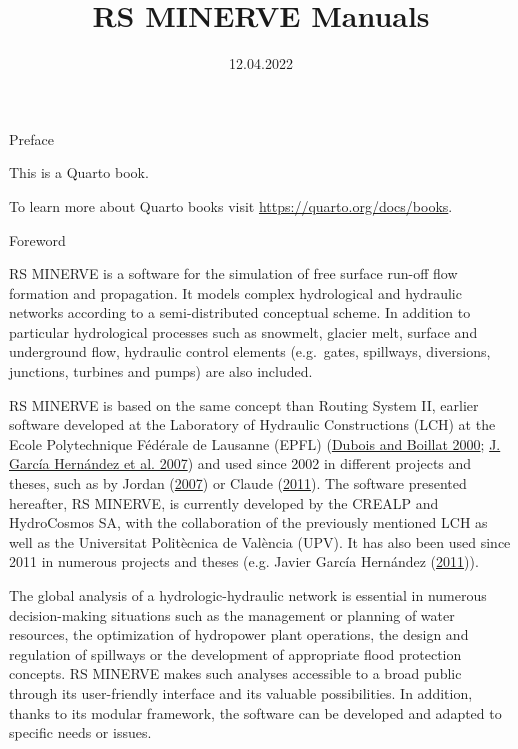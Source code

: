 \documentclass[
  letterpaper,
  DIV=11,
  numbers=noendperiod]{scrreprt}
\title{RS MINERVE Manuals}
\author{}
\date{12.04.2022}
\renewcommand*\contentsname{Table of contents}
\newcommand\contentsname{Table of contents}
\begin{document}
\maketitle

\ifdefined\Shaded\renewenvironment{Shaded}{\begin{tcolorbox}[frame hidden, borderline west={3pt}{0pt}{shadecolor}, enhanced, interior hidden, sharp corners, breakable, boxrule=0pt]}{\end{tcolorbox}}\fi

\renewcommand*\contentsname{Table of contents}
{
\hypersetup{linkcolor=}
\setcounter{tocdepth}{3}
\tableofcontents
}
Preface

This is a Quarto book.

To learn more about Quarto books visit
\url{https://quarto.org/docs/books}.

Foreword

RS MINERVE is a software for the simulation of free surface run-off flow
formation and propagation. It models complex hydrological and hydraulic
networks according to a semi-distributed conceptual scheme. In addition
to particular hydrological processes such as snowmelt, glacier melt,
surface and underground flow, hydraulic control elements (e.g.~gates,
spillways, diversions, junctions, turbines and pumps) are also included.

RS MINERVE is based on the same concept than Routing System II, earlier
software developed at the Laboratory of Hydraulic Constructions (LCH) at
the Ecole Polytechnique Fédérale de Lausanne (EPFL)
(\protect\hyperlink{ref-dubois_routing_2000}{Dubois and Boillat 2000};
\protect\hyperlink{ref-garcia_hernandez_routing_2007}{J. García
Hernández et al. 2007}) and used since 2002 in different projects and
theses, such as by Jordan
(\protect\hyperlink{ref-jordan_modeprevision_2007}{2007}) or Claude
(\protect\hyperlink{ref-claude_evolution_2011}{2011}). The software
presented hereafter, RS MINERVE, is currently developed by the CREALP
and HydroCosmos SA, with the collaboration of the previously mentioned
LCH as well as the Universitat Politècnica de València (UPV). It has
also been used since 2011 in numerous projects and theses (e.g. Javier
García Hernández
(\protect\hyperlink{ref-garcia_hernandez_flood_2011}{2011})).

The global analysis of a hydrologic-hydraulic network is essential in
numerous decision-making situations such as the management or planning
of water resources, the optimization of hydropower plant operations, the
design and regulation of spillways or the development of appropriate
flood protection concepts. RS MINERVE makes such analyses accessible to
a broad public through its user-friendly interface and its valuable
possibilities. In addition, thanks to its modular framework, the
software can be developed and adapted to specific needs or issues.
\end{document}
